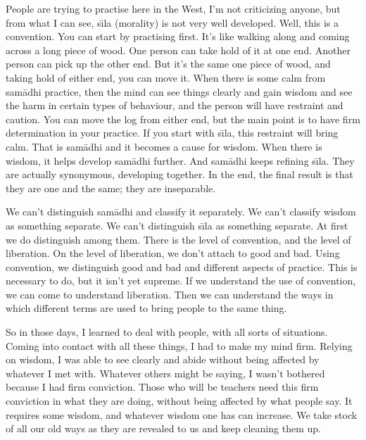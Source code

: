 People are trying to practise here in the West, I'm not criticizing anyone, but from what I can see, s\={\i}la (morality) is not very well developed. Well, this is a convention. You can start by practising  first. It's like walking along and coming across a long piece of wood. One person can take hold of it at one end. Another person can pick up the other end. But it's the same one piece of wood, and taking hold of either end, you can move it. When there is some calm from sam\=adhi practice, then the mind can see things clearly and gain wisdom and see the harm in certain types of behaviour, and the person will have restraint and caution. You can move the log from either end, but the main point is to have firm determination in your practice. If you start with s\={\i}la, this restraint will bring calm. That is sam\=adhi and it becomes a cause for wisdom. When there is wisdom, it helps develop sam\=adhi further. And sam\=adhi keeps refining s\={\i}la. They are actually synonymous, developing together. In the end, the final result is that they are one and the same; they are inseparable. 

We can't distinguish sam\=adhi and classify it separately. We can't classify wisdom as something separate. We can't distinguish s\={\i}la as something separate. At first we do distinguish among them. There is the level of convention, and the level of liberation. On the level of liberation, we don't attach to good and bad. Using convention, we distinguish good and bad and different aspects of practice. This is necessary to do, but it isn't yet supreme. If we understand the use of convention, we can come to understand liberation. Then we can understand the ways in which different terms are used to bring people to the same thing. 

So in those days, I learned to deal with people, with all sorts of situations. Coming into contact with all these things, I had to make my mind firm. Relying on wisdom, I was able to see clearly and abide without being affected by whatever I met with. Whatever others might be saying, I wasn't bothered because I had firm conviction. Those who will be teachers need this firm conviction in what they are doing, without being affected by what people say. It requires some wisdom, and whatever wisdom one has can increase. We take stock of all our old ways as they are revealed to us and keep cleaning them up. 

